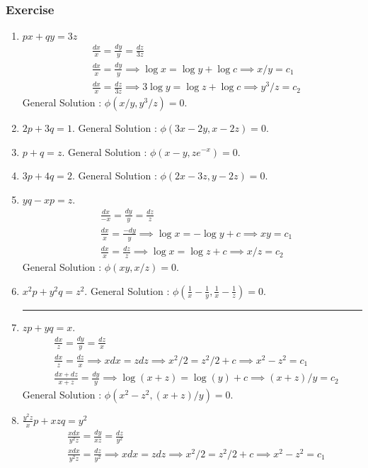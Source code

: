 \subsubsection*{Exercise}
\begin{enumerate}
	\item $px + qy = 3z$
	\begin{align*}
		& \frac{dx}{x} = \frac{dy}{y} = \frac{dz}{3z}\\
		& \frac{dx}{x} = \frac{dy}{y} \implies \log x = \log y + \log c \implies x/y = c_1 \\
		& \frac{dx}{x} = \frac{dz}{3z} \implies 3\log y = \log z + \log c \implies y^3/z = c_2
	\end{align*}
		General Solution : $\phi(x/y,y^3/z) = 0$.
	\item $2p + 3q = 1$.
		General Solution : $\phi(3x-2y,x-2z) = 0$.
	\item $p+q = z$.
		General Solution : $\phi(x-y,ze^{-x}) = 0$.
	\item $3p+4q = 2$.
		General Solution : $\phi(2x-3z,y-2z) = 0$.
	\item $yq - xp = z$.
		\begin{align*}
			& \frac{dx}{-x} = \frac{dy}{y} = \frac{dz}{z} \\
			& \frac{dx}{x} = \frac{-dy}{y} \implies \log x = -\log y + c \implies xy = c_1 \\
			& \frac{dx}{x} = \frac{dz}{z} \implies \log x = \log z + c \implies x/z = c_2
		\end{align*}
		General Solution : $\phi(xy,x/z) = 0$.
	\item $x^2p + y^2q = z^2$.
		General Solution : $\phi(\frac{1}{x}-\frac{1}{y},\frac{1}{x}-\frac{1}{z}) = 0$.
		\hrule
	\item $zp + yq = x$.
	\begin{align*}
		& \frac{dx}{z} = \frac{dy}{y} = \frac{dz}{x} \\
		& \frac{dx}{z} = \frac{dz}{x} \implies xdx = zdz \implies x^2/2 = z^2/2 +c \implies x^2-z^2 = c_1\\
		& \frac{dx+dz}{x+z} = \frac{dy}{y} \implies \log(x+z) = \log(y)+c \implies (x+z)/y = c_2
	\end{align*}
		General Solution : $\phi(x^2-z^2,(x+z)/y) = 0$.
	\item $\frac{y^2z}{x}p + xzq = y^2$
		\begin{align*}
			& \frac{xdx}{y^2z} = \frac{dy}{xz} = \frac{dz}{y^2} \\
			& \frac{xdx}{y^2z} = \frac{dz}{y^2} \implies xdx = zdz \implies x^2/2 = z^2/2 + c \implies x^2-z^2 = c_1 \\

\end{align*}
\end{enumerate}
